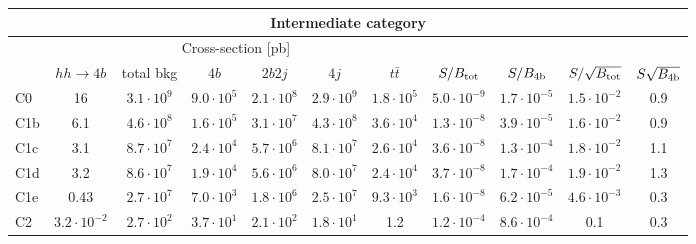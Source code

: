 \begin{tabular}{|l|cc|cccc|cccc|}
  \hline
\multicolumn{11}{|c|}{Intermediate category}\\
\hline
&  \multicolumn{6}{c|}{Cross-section [pb]} &  &  & &  \\
   &  $hh\to 4b$ &  total bkg  &   $4b$    &  $2b2j$   &   $4j$    &
$t\bar{t}$ &
$S/B_{\rm tot}$ & $S/B_{\rm 4b}$ & $S/\sqrt{B_{\rm tot}}$ & $S\sqrt{B_{\rm 4b}}$ \\
  \hline
  \hline
C0      & 16  &   $3.1\cdot 10^9$   & $9.0\cdot 10^5$ &  $2.1\cdot 10^8$ & $2.9\cdot 10^9$ & $1.8\cdot 10^5$ &   $5.0\cdot 10^{-9}$   & $1.7\cdot 10^{-5}$ &    $1.5\cdot 10^{-2}$   & 0.9\\
 C1b     & 6.1  &  $ 4.6\cdot 10^8$   &$ 1.6\cdot 10^5$ & $3.1\cdot 10^7$ & $4.3\cdot 10^8$ & $3.6\cdot 10^4$  &  $ 1.3\cdot 10^{-8}$   & $3.9\cdot 10^{-5}$  & $1.6\cdot 10^{-2}$   & 0.9 \\
 C1c     & 3.1  &   $8.7\cdot 10^7 $  & $2.4\cdot 10^4$ & $5.7\cdot 10^6$ & $8.1\cdot 10^7$ & $2.6\cdot 10^4$ &   $3.6\cdot 10^{-8}$   & $1.3\cdot 10^{-4}$ &  $1.8\cdot 10^{-2}$    & 1.1 \\ 
 C1d     & 3.2  &   $8.6\cdot 10^7 $  & $1.9\cdot 10^4$ & $5.6\cdot 10^6$ & $8.0\cdot 10^7$ & $2.4\cdot 10^4$  &   $3.7\cdot 10^{-8}$   & $1.7\cdot 10^{-4}$ &   $1.9\cdot 10^{-2}$   & 1.3 \\
 C1e     & 0.43  &   $2.7\cdot 10^7$   & $7.0\cdot 10^3$ & $1.8\cdot 10^6$ & $2.5\cdot 10^7$ & $9.3\cdot 10^3$  &   $1.6\cdot 10^{-8}$   & $6.2\cdot 10^{-5}$  &     $4.6\cdot 10^{-3}$   & 0.3 \\
 C2      & $3.2\cdot 10^{-2}$  &   $2.7\cdot 10^2$   & $3.7\cdot 10^1$ & $2.1\cdot 10^2$ & $1.8\cdot 10^1$ & 1.2 &  $ 1.2\cdot 10^{-4}$   & $8.6\cdot 10^{-4}$  &      0.1   & 0.3 \\
\hline
\end{tabular}

